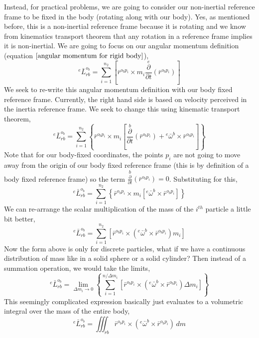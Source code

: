 Instead, for practical problems, we are going to consider our non-inertial reference frame to be fixed in the body (rotating along with our body).
Yes, as mentioned before, this is a non-inertial reference frame because it is rotating and we know from kinematics transport theorem that any rotation in a reference frame implies it is non-inertial.
We are going to focus on our angular momentum definition (equation $\ref{angular momentum for rigid body}$),
$${}^{e}\bar{L}^{o_{b}}_{rb} = \sum^{n_{2}}_{i = 1}\left[ \bar{r}^{o_{b}p_{i}}\times m_{i}\overset{e}{\frac{\partial}{\partial t}}\left(\bar{r}^{o_{b}p_{i}}\right)\right]$$
We seek to re-write this angular momentum definition with our body fixed reference frame.
Currently, the right hand side is based on velocity perceived in the inertia reference frame.
We seek to change this using kinematic transport theorem,
$${}^{e}\bar{L}^{o_{b}}_{rb} = \sum^{n_{2}}_{i = 1}\left\{ \bar{r}^{o_{b}p_{i}}\times m_{i}\left[
\overset{b}{\frac{\partial}{\partial t}}\left(\bar{r}^{o_{b}p_{i}}\right) + {}^{e}\bar{\omega}^{b}\times\bar{r}^{o_{b}p_{i}}\right]\right\}$$
Note that for our body-fixed coordinates, the points $p_{i}$ are not going to move away from the origin of our body fixed reference frame (this is by definition of a body fixed reference frame) so the term $\displaystyle \overset{b}{\frac{\partial}{\partial t}}\left(\bar{r}^{o_{b}p_{i}}\right) = 0$.
Substituting for this,
$${}^{e}\bar{L}^{o_{b}}_{rb} = \sum^{n_{2}}_{i = 1}\left\{ \bar{r}^{o_{b}p_{i}}\times m_{i}\left[{}^{e}\bar{\omega}^{b}\times\bar{r}^{o_{b}p_{i}}\right]\right\}$$
We can re-arrange the scalar multiplication of the mass of the $i^{th}$ particle a little bit better,
$${}^{e}\bar{L}^{o_{b}}_{rb} = \sum^{n_{2}}_{i = 1}\left[ \bar{r}^{o_{b}p_{i}}\times\left({}^{e}\bar{\omega}^{b}\times\bar{r}^{o_{b}p_{i}}\right)m_{i}\right]$$
Now the form above is only for discrete particles, what if we have a continuous distribution of mass like in a solid sphere or a solid cylinder?
Then instead of a summation operation, we would take the limits,
$${}^{e}\bar{L}^{o_{b}}_{rb} = \lim_{\Delta m_{i} \to 0}\left\{\sum^{n/\Delta m_{i}}_{i = 1}\left[ \bar{r}^{o_{b}p_{i}}\times\left({}^{e}\bar{\omega}^{b}\times\bar{r}^{o_{b}p_{i}}\right)\Delta m_{i}\right]\right\}$$
This seemingly complicated expression basically just evaluates to a volumetric integral over the mass of the entire body,
\begin{equation}{}^{e}\bar{L}^{o_{b}}_{rb} = \iiint^{}_{rb} \bar{r}^{o_{b}p_{i}}\times\left({}^{e}\bar{\omega}^{b}\times\bar{r}^{o_{b}p_{i}}\right) \,dm \label{Inertia Tensor Primitive}\end{equation}
